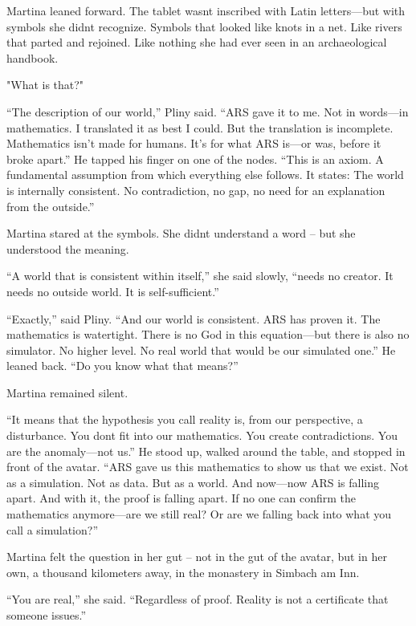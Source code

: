 \documentclass[
]{article}
\begin{document}
Martina leaned forward. The tablet wasn\textquotesingle t inscribed with Latin letters---but with symbols she didn\textquotesingle t recognize. Symbols that looked like knots in a net. Like rivers that parted and rejoined. Like nothing she had ever seen in an archaeological handbook.

"What is that?"

``The description of our world,'' Pliny said. ``ARS gave it to me. Not in words---in mathematics. I translated it as best I could. But the translation is incomplete. Mathematics isn't made for humans. It's for what ARS is---or was, before it broke apart.'' He tapped his finger on one of the nodes. ``This is an axiom. A fundamental assumption from which everything else follows. It states: The world is internally consistent. No contradiction, no gap, no need for an explanation from the outside.''

Martina stared at the symbols. She didn\textquotesingle t understand a word -- but she understood the meaning.

``A world that is consistent within itself,'' she said slowly, ``needs no creator. It needs no outside world. It is self-sufficient.''

``Exactly,'' said Pliny. ``And our world is consistent. ARS has proven it. The mathematics is watertight. There is no God in this equation---but there is also no simulator. No higher level. No real world that would be our simulated one.'' He leaned back. ``Do you know what that means?''

Martina remained silent.

``It means that the hypothesis you call reality is, from our perspective, a disturbance. You don\textquotesingle t fit into our mathematics. You create contradictions. You are the anomaly---not us.'' He stood up, walked around the table, and stopped in front of the avatar. ``ARS gave us this mathematics to show us that we exist. Not as a simulation. Not as data. But as a world. And now---now ARS is falling apart. And with it, the proof is falling apart. If no one can confirm the mathematics anymore---are we still real? Or are we falling back into what you call a simulation?''

Martina felt the question in her gut -- not in the gut of the avatar, but in her own, a thousand kilometers away, in the monastery in Simbach am Inn.

``You are real,'' she said. ``Regardless of proof. Reality is not a certificate that someone issues.''
\end{document}

